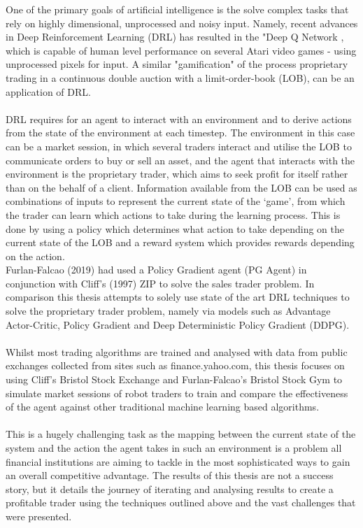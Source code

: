 \documentclass[ %
                    author={Ashwinder Khurana},
                supervisor={Prof Dave Cliff},
                    degree={MEng},
                     title={The Deeply Reinforced Trader},
                  subtitle={},
                      type={enterprise},
                      year={2020} ]{dissertation}
\begin{document}
\noindent
One of the primary goals of artificial intelligence is the solve complex tasks that rely on highly dimensional, unprocessed and noisy input. Namely, recent advances in Deep Reinforcement Learning (DRL) has resulted in the "Deep Q Network \cite{DQN}, which is capable of human level performance on several Atari video games - using unprocessed pixels for input. A similar "gamification" of the process proprietary trading in a continuous double auction with a limit-order-book (LOB), can be an application of DRL.
\\
\\
DRL requires for an agent to interact with an environment and to derive actions from the state of the environment at each timestep. The environment in this case can be a market session, in which several traders interact and utilise the LOB to communicate orders to buy or sell an asset, and the agent that interacts with the environment is the proprietary trader, which aims to seek profit for itself rather than on the behalf of a client. Information available from the LOB can be used as combinations of inputs to represent the current state of the \enquote*{game}, from which the trader can learn which actions to take during the learning process. This is done by using a policy which determines what action to take depending on the current state of the LOB and a reward system which provides rewards depending on the action.
\\
Furlan-Falcao (2019) had used a Policy Gradient agent (PG Agent) in conjunction with Cliff's (1997) ZIP to solve the sales trader problem. In comparison this thesis attempts to solely use state of the art DRL techniques to solve the proprietary trader problem, namely via models such as Advantage Actor-Critic, Policy Gradient and Deep Deterministic Policy Gradient (DDPG). 
\\
\\
Whilst most trading algorithms are trained and analysed with data from public exchanges collected from sites such as finance.yahoo.com, this thesis focuses on using Cliff's Bristol Stock Exchange \cite{BSE} and Furlan-Falcao's Bristol Stock Gym \cite{BSG} to simulate market sessions of robot traders to train and compare the effectiveness of the agent against other traditional machine learning based algorithms.
\\
\\
This is a hugely challenging task as the mapping between the current state of the system and the action the agent takes in such an environment is a problem all financial institutions are aiming to tackle in the most sophisticated ways to gain an overall competitive advantage. The results of this thesis are not a success story, but it details the journey of iterating and analysing results to create a profitable trader using the techniques outlined above and the vast challenges that were presented.   
\end{document}
